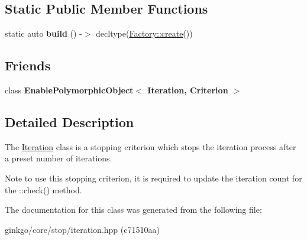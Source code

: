 \subsection*{Static Public Member Functions}
\begin{DoxyCompactItemize}
\item 
\mbox{\label{classgko_1_1stop_1_1Iteration_ae1644e1beb79d560ec9f1e63d147e258}} 
static auto {\bfseries build} () -\/$>$ decltype(\hyperlink{classgko_1_1EnableDefaultFactory_a1d077101d9e788e6c65f088612d14cc3}{Factory\+::create}())
\end{DoxyCompactItemize}
\subsection*{Friends}
\begin{DoxyCompactItemize}
\item 
\mbox{\label{classgko_1_1stop_1_1Iteration_a53441469892d9e127b487d868cd90aee}} 
class {\bfseries Enable\+Polymorphic\+Object$<$ Iteration, Criterion $>$}
\end{DoxyCompactItemize}


\subsection{Detailed Description}
The \hyperlink{classgko_1_1stop_1_1Iteration}{Iteration} class is a stopping criterion which stops the iteration process after a preset number of iterations. 

\begin{DoxyNote}{Note}
to use this stopping criterion, it is required to update the iteration count for the \+::check() method. 
\end{DoxyNote}


The documentation for this class was generated from the following file\+:\begin{DoxyCompactItemize}
\item 
ginkgo/core/stop/iteration.\+hpp (c71510aa)\end{DoxyCompactItemize}
